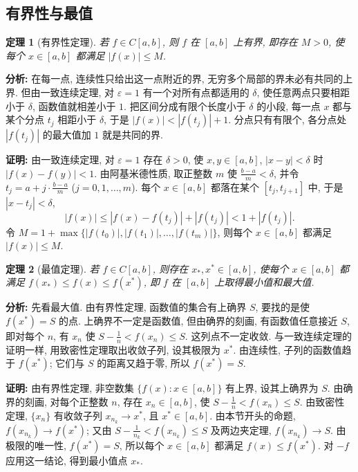 \documentclass[UTF8,openany]{ctexbook}
\theoremstyle{chinesetextbook}
\newtheorem{theorem}{定理}[section]
\newenvironment{cnproof}{\par\indent\textbf{证明:} \ignorespaces}{\par}
\begin{document}
\subsection{有界性与最值}
\begin{theorem}[有界性定理]
若 $f\in C[a,b]$, 则 $f$ 在 $[a,b]$ 上有界, 即存在 $M>0$, 使每个 $x\in[a,b]$ 都满足 $|f(x)|\le M$.
\end{theorem}
\par\indent\textbf{分析:} 在每一点, 连续性只给出这一点附近的界, 无穷多个局部的界未必有共同的上界. 但由一致连续定理, 对 $\varepsilon=1$ 有一个对所有点都适用的 $\delta$, 使任意两点只要相距小于 $\delta$, 函数值就相差小于 $1$. 把区间分成有限个长度小于 $\delta$ 的小段, 每一点 $x$ 都与某个分点 $t_j$ 相距小于 $\delta$, 于是 $|f(x)|<|f(t_j)|+1$. 分点只有有限个, 各分点处 $|f(t_j)|$ 的最大值加 $1$ 就是共同的界.
\begin{cnproof}
由一致连续定理, 对 $\varepsilon=1$ 存在 $\delta>0$, 使 $x,y\in[a,b]$, $|x-y|<\delta$ 时 $|f(x)-f(y)|<1$. 由阿基米德性质, 取正整数 $m$ 使 $\displaystyle\frac{b-a}m<\delta$, 并令 $\displaystyle t_j=a+j\cdot\frac{b-a}m$ ($j=0,1,\ldots,m$). 每个 $x\in[a,b]$ 都落在某个 $[t_j,t_{j+1}]$ 中, 于是 $|x-t_j|<\delta$,
\[
|f(x)|\le|f(x)-f(t_j)|+|f(t_j)|<1+|f(t_j)|.
\]
令 $M=1+\max\{|f(t_0)|,|f(t_1)|,\ldots,|f(t_m)|\}$, 则每个 $x\in[a,b]$ 都满足 $|f(x)|\le M$.
\end{cnproof}
\begin{theorem}[最值定理]
若 $f\in C[a,b]$, 则存在 $x_*,x^*\in[a,b]$, 使每个 $x\in[a,b]$ 都满足 $f(x_*)\le f(x)\le f(x^*)$, 即 $f$ 在 $[a,b]$ 上取得最小值和最大值.
\end{theorem}
\par\indent\textbf{分析:} 先看最大值. 由有界性定理, 函数值的集合有上确界 $S$, 要找的是使 $f(x^*)=S$ 的点. 上确界不一定是函数值, 但由确界的刻画, 有函数值任意接近 $S$, 即对每个 $n$, 有 $x_n$ 使 $\displaystyle S-\frac1n<f(x_n)\le S$. 这列点不一定收敛. 与一致连续定理的证明一样, 用致密性定理取出收敛子列, 设其极限为 $x^*$. 由连续性, 子列的函数值趋于 $f(x^*)$; 它们与 $S$ 的距离又趋于零, 所以 $f(x^*)=S$.
\begin{cnproof}
由有界性定理, 非空数集 $\{f(x):x\in[a,b]\}$ 有上界, 设其上确界为 $S$. 由确界的刻画, 对每个正整数 $n$, 存在 $x_n\in[a,b]$, 使 $\displaystyle S-\frac1n<f(x_n)\le S$. 由致密性定理, $\{x_n\}$ 有收敛子列 $x_{n_k}\to x^*$, 且 $x^*\in[a,b]$. 由本节开头的命题, $f(x_{n_k})\to f(x^*)$; 又由 $\displaystyle S-\frac1{n_k}<f(x_{n_k})\le S$ 及两边夹定理, $f(x_{n_k})\to S$. 由极限的唯一性, $f(x^*)=S$, 所以每个 $x\in[a,b]$ 都满足 $f(x)\le f(x^*)$. 对 $-f$ 应用这一结论, 得到最小值点 $x_*$.
\end{cnproof}
\end{document}
